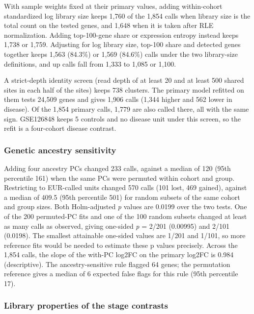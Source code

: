With sample weights fixed at their primary values, adding within-cohort standardized log library size keeps 1,760 of the 1,854 calls when library size is the total count on the tested genes, and 1,648 when it is taken after RLE normalization. Adding top-100-gene share or expression entropy instead keeps 1,738 or 1,759. Adjusting for log library size, top-100 share and detected genes together keeps 1,563 (84.3\%) or 1,569 (84.6\%) calls under the two library-size definitions, and up calls fall from 1,333 to 1,085 or 1,100.

A strict-depth identity screen (read depth of at least 20 and at least 500 shared sites in each half of the sites) keeps 738 clusters. The primary model refitted on them tests 24,509 genes and gives 1,906 calls (1,344 higher and 562 lower in disease). Of the 1,854 primary calls, 1,779 are also called there, all with the same sign. GSE126848 keeps 5 controls and no disease unit under this screen, so the refit is a four-cohort disease contrast.

\subsubsection{Genetic ancestry sensitivity}\label{genetic-ancestry-sensitivity}

Adding four ancestry PCs changed 233 calls, against a median of 120 (95th percentile 161) when the same PCs were permuted within cohort and group. Restricting to EUR-called units changed 570 calls (101 lost, 469 gained), against a median of 409.5 (95th percentile 501) for random subsets of the same cohort and group sizes. Both Holm-adjusted \emph{p} values are 0.0199 over the two tests. One of the 200 permuted-PC fits and one of the 100 random subsets changed at least as many calls as observed, giving one-sided \emph{p} = 2/201 (0.00995) and 2/101 (0.0198). The smallest attainable one-sided values are 1/201 and 1/101, so more reference fits would be needed to estimate these p values precisely. Across the 1,854 calls, the slope of the with-PC log2FC on the primary log2FC is 0.984 (descriptive). The ancestry-sensitive rule flagged 64 genes; the permutation reference gives a median of 6 expected false flags for this rule (95th percentile 17).

\subsubsection{Library properties of the stage contrasts}\label{library-properties-of-the-stage-contrasts}

